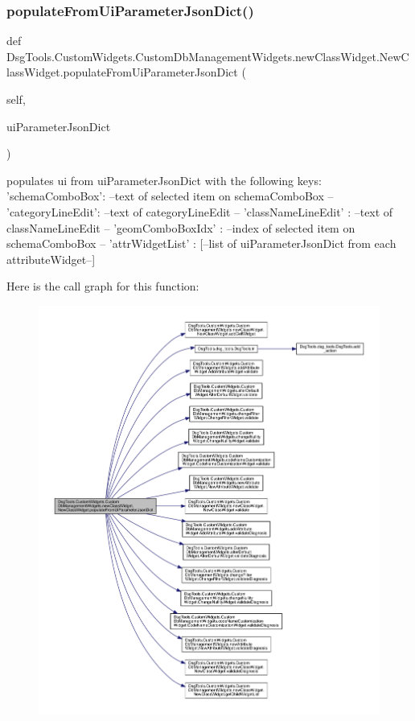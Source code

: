 \subsubsection{\texorpdfstring{populate\+From\+Ui\+Parameter\+Json\+Dict()}{populateFromUiParameterJsonDict()}}
{\footnotesize\ttfamily def Dsg\+Tools.\+Custom\+Widgets.\+Custom\+Db\+Management\+Widgets.\+new\+Class\+Widget.\+New\+Class\+Widget.\+populate\+From\+Ui\+Parameter\+Json\+Dict (\begin{DoxyParamCaption}\item[{}]{self,  }\item[{}]{ui\+Parameter\+Json\+Dict }\end{DoxyParamCaption})}

\begin{DoxyVerb}populates ui from  uiParameterJsonDict with the following keys:
{
    'schemaComboBox': --text of selected item on schemaComboBox --
    'categoryLineEdit': --text of categoryLineEdit --
    'classNameLineEdit' : --text of classNameLineEdit --
    'geomComboBoxIdx' : --index of selected item on schemaComboBox --
    'attrWidgetList' : [--list of uiParameterJsonDict from each attributeWidget--]
}
\end{DoxyVerb}
 Here is the call graph for this function\+:
\nopagebreak
\begin{figure}[H]
\begin{center}
\leavevmode
\includegraphics[width=350pt]{class_dsg_tools_1_1_custom_widgets_1_1_custom_db_management_widgets_1_1new_class_widget_1_1_new_class_widget_aaec55aa688c84ae74a41be0a7276ef65_cgraph}
\end{center}
\end{figure}
